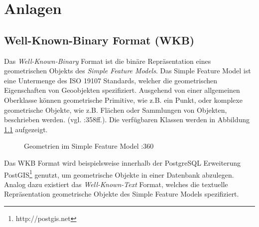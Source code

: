 \appendix
\chapter{Anlagen}
\section{Well-Known-Binary Format (WKB)}
\label{sec:appendix:wkb}
Das \textit{Well-Known-Binary} Format ist die binäre Repräsentation eines geometrischen Objekts des \textit{Simple Feature Models}.
Das Simple Feature Model ist eine Untermenge des ISO 19107 Standards, welcher die geometrischen Eigenschaften von Geoobjekten spezifiziert. Ausgehend von einer allgemeinen Oberklasse können geometrische Primitive, wie z.B. ein Punkt, oder komplexe geometrische Objekte, wie z.B. Flächen oder Sammlungen von Objekten, beschrieben werden. (vgl. \cite{Bill2010}:358ff.). Die verfügbaren Klassen werden in Abbildung \ref{fig:bill_sfm} aufgezeigt.
\begin{figure}[!htb]
  \centering
   \caption{Geometrien im Simple Feature Model \protect\cite{Bill2010}:360}
   \label{fig:bill_sfm}
\end{figure}

Das WKB Format wird beispielsweise innerhalb der PostgreSQL Erweiterung PostGIS\footnote{http://postgis.net} genutzt, um geometrische Objekte in einer Datenbank abzulegen.
Analog dazu existiert das \textit{Well-Known-Text} Format, welches die textuelle Repräsentation geometrische Objekte des Simple Feature Models spezifiziert.


